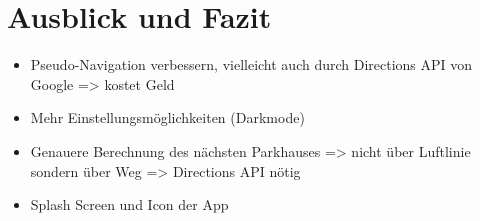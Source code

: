 \chapter{Ausblick und Fazit}
\label{chap:7}

\begin{itemize}
	\item Pseudo-Navigation verbessern, vielleicht auch durch Directions API von Google => kostet Geld
	\item Mehr Einstellungsmöglichkeiten (Darkmode)
	\item Genauere Berechnung des nächsten Parkhauses => nicht über Luftlinie sondern über Weg => Directions API nötig
	\item Splash Screen und Icon der App
\end{itemize}